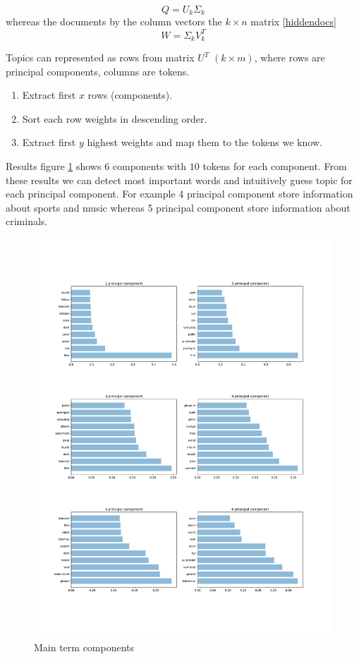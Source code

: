 \documentclass{article}
\begin{document}
\begin{equation}
\label{hiddenterms}
Q = U_k\Sigma_k
\end{equation}
whereas the documents by the column vectors the $k \times n$ matrix \ref{hiddendocs}
 \begin{equation}
\label{hiddendocs}
W =\Sigma_kV_k^T
\end{equation}

Topics can represented as rows from matrix $U^T$ $(k \times m)$, where rows are principal components, columns are tokens. 
\begin{enumerate}
\item Extract first $x$ rows (components).
\item Sort each row weights in descending order.
\item Extract first $y$ highest weights and map them to the tokens we know.
\end{enumerate}


 Results figure \ref{main_terms_components} shows $6$ components with $10$ tokens for each component. From these results we can detect most important words and intuitively guess topic for each principal component. For example 4 principal component store information about  sports and music whereas 5 principal component store information about criminals.


\begin{figure}[H]
  \centering
  \includegraphics[scale=0.4]{images/main_term_components.pdf}
  \caption{Main term components}
  \label{main_terms_components}
\end{figure}
\end{document}
